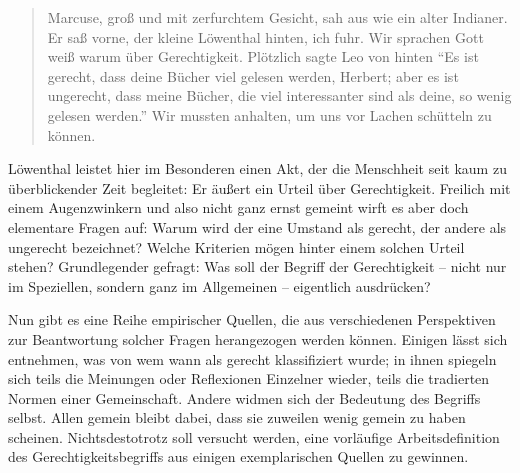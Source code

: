 \documentclass[a4paper]{thesis}
\begin{document}
\begin{quote}
Marcuse, groß und mit zerfurchtem Gesicht, sah aus wie ein alter Indianer. Er saß vorne, der kleine Löwenthal hinten, ich fuhr. Wir sprachen Gott weiß warum über Gerechtigkeit. Plötzlich sagte Leo von hinten \enquote{Es ist gerecht, dass deine Bücher viel gelesen werden, Herbert; aber es ist ungerecht, dass meine Bücher, die viel interessanter sind als deine, so wenig gelesen werden.} Wir mussten anhalten, um uns vor Lachen schütteln zu können.
\end{quote}

Löwenthal leistet hier im Besonderen einen Akt, der die Menschheit seit kaum zu überblickender Zeit begleitet: Er äußert ein Urteil über Gerechtigkeit. Freilich mit einem Augenzwinkern und also nicht ganz ernst gemeint wirft es aber doch elementare Fragen auf: Warum wird der eine Umstand als gerecht, der andere als ungerecht bezeichnet? Welche Kriterien mögen hinter einem solchen Urteil stehen? Grundlegender gefragt: Was soll der Begriff der Gerechtigkeit -- nicht nur im Speziellen, sondern ganz im Allgemeinen -- eigentlich ausdrücken?

Nun gibt es eine Reihe empirischer Quellen, die aus verschiedenen Perspektiven zur Beantwortung solcher Fragen herangezogen werden können. Einigen lässt sich entnehmen, was von wem wann als gerecht klassifiziert wurde; in ihnen spiegeln sich teils die Meinungen oder Reflexionen Einzelner wieder, teils die tradierten Normen einer Gemeinschaft. Andere widmen sich der Bedeutung des Begriffs selbst. Allen gemein bleibt dabei, dass sie zuweilen wenig gemein zu haben scheinen. Nichtsdestotrotz soll versucht werden, eine vorläufige Arbeitsdefinition des Gerechtigkeitsbegriffs aus einigen exemplarischen Quellen zu gewinnen.
\end{document}
